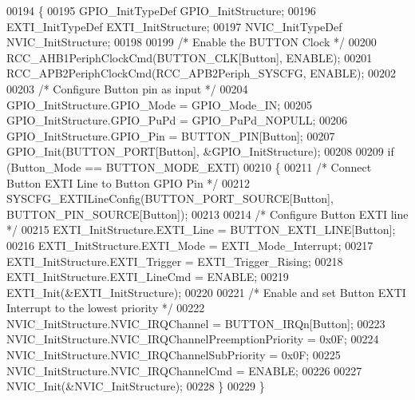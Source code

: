\begin{DoxyCode}
00194 \{
00195   GPIO_InitTypeDef GPIO\_InitStructure;
00196   EXTI_InitTypeDef EXTI\_InitStructure;
00197   NVIC_InitTypeDef NVIC_InitStructure;
00198 
00199   \textcolor{comment}{/* Enable the BUTTON Clock */}
00200   RCC_AHB1PeriphClockCmd(BUTTON_CLK[Button], ENABLE);
00201   RCC_APB2PeriphClockCmd(RCC_APB2Periph_SYSCFG, ENABLE);
00202 
00203   \textcolor{comment}{/* Configure Button pin as input */}
00204   GPIO\_InitStructure.GPIO_Mode = GPIO_Mode_IN;
00205   GPIO\_InitStructure.GPIO_PuPd = GPIO_PuPd_NOPULL;
00206   GPIO\_InitStructure.GPIO_Pin = BUTTON_PIN[Button];
00207   GPIO_Init(BUTTON_PORT[Button], &GPIO\_InitStructure);
00208 
00209   \textcolor{keywordflow}{if} (Button\_Mode == BUTTON_MODE_EXTI)
00210   \{
00211     \textcolor{comment}{/* Connect Button EXTI Line to Button GPIO Pin */}
00212     SYSCFG_EXTILineConfig(BUTTON_PORT_SOURCE[Button], BUTTON_PIN_SOURCE[Button]);
00213 
00214     \textcolor{comment}{/* Configure Button EXTI line */}
00215     EXTI\_InitStructure.EXTI_Line = BUTTON_EXTI_LINE[Button];
00216     EXTI\_InitStructure.EXTI_Mode = EXTI_Mode_Interrupt;
00217     EXTI\_InitStructure.EXTI_Trigger = EXTI_Trigger_Rising;  
00218     EXTI\_InitStructure.EXTI_LineCmd = ENABLE;
00219     EXTI_Init(&EXTI\_InitStructure);
00220 
00221     \textcolor{comment}{/* Enable and set Button EXTI Interrupt to the lowest priority */}
00222     NVIC\_InitStructure.NVIC_IRQChannel = BUTTON_IRQn[Button];
00223     NVIC\_InitStructure.NVIC_IRQChannelPreemptionPriority = 0x0F;
00224     NVIC\_InitStructure.NVIC_IRQChannelSubPriority = 0x0F;
00225     NVIC\_InitStructure.NVIC_IRQChannelCmd = ENABLE;
00226 
00227     NVIC_Init(&NVIC\_InitStructure); 
00228   \}
00229 \}
\end{DoxyCode}
